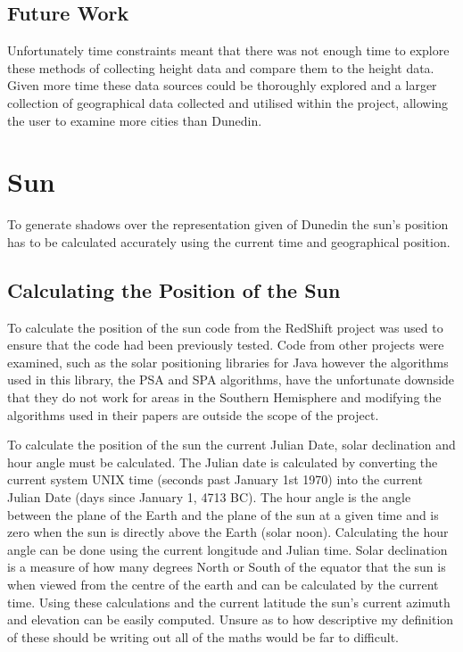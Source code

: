 \documentclass[12pt]{report}
\begin{document}
\subsection{Future Work}
Unfortunately time constraints meant that there was not enough time to explore these methods of collecting height data and compare them to the height data.
 Given more time these data sources could be thoroughly explored and a larger collection of geographical data collected and utilised within the project, allowing the user to examine more cities than Dunedin.

\section{Sun}
To generate shadows over the representation given of Dunedin the sun's position has to be calculated accurately using the current time and geographical position.


\subsection{Calculating the Position of the Sun}
To calculate the position of the sun code from the RedShift project\cite{redshift} was used to ensure that the code had been previously tested. Code from other projects were examined, such as the solar positioning libraries for Java\cite{javasunlib} however the algorithms used in this library, the PSA\cite{psa} and SPA\cite{spa} algorithms, have the unfortunate downside that they do not work for areas in the Southern Hemisphere and modifying the algorithms used in their papers are outside the scope of the project.

To calculate the position of the sun the current Julian Date, solar declination and hour angle must be calculated. The Julian date is calculated by converting the current system UNIX time (seconds past January 1st 1970) into the current Julian Date (days since January 1, 4713 BC).
The hour angle is the angle between the plane of the Earth and the plane of the sun at a given time and is zero when the sun is directly above the Earth (solar noon). Calculating the hour angle can be done using the current longitude and Julian time. Solar declination is a measure of how many degrees North or South of the equator that the sun is when viewed from the centre of the earth and can be calculated by the current time. Using these calculations and the current latitude the sun's current azimuth and elevation can be easily computed.
Unsure as to how descriptive my definition of these should be writing out all of the maths would be far to difficult. 
\end{document}

